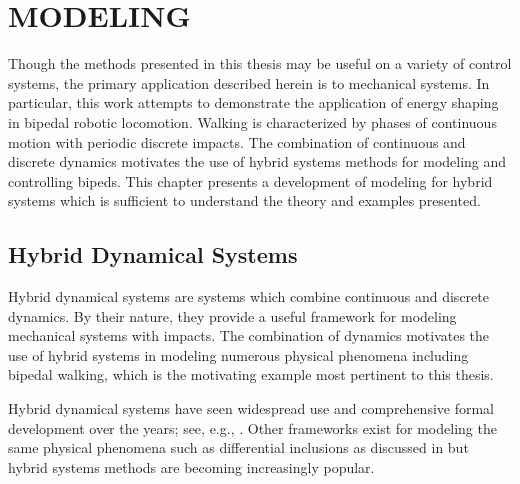 \chapter{\uppercase{Modeling}} \label{ch:modeling}

Though the methods presented in this thesis may be useful on a variety of
control systems, the primary application described herein is to mechanical
systems.
%
In particular, this work attempts to demonstrate the application of energy
shaping in bipedal robotic locomotion.
%
Walking is characterized by phases of continuous motion with periodic discrete
impacts.
%
The combination of continuous and discrete dynamics motivates the use of hybrid
systems methods for modeling and controlling bipeds.
%
This chapter presents a development of modeling for hybrid systems which is
sufficient to understand the theory and examples presented.


\section{Hybrid Dynamical Systems}

Hybrid dynamical systems are systems which combine continuous and discrete
dynamics.
%
By their nature, they provide a useful framework for modeling mechanical systems
with impacts.
%
The combination of dynamics motivates the use of hybrid systems in modeling
numerous physical phenomena including bipedal walking, which is the motivating
example most pertinent to this thesis.
%

Hybrid dynamical systems have seen widespread use and comprehensive formal
development over the years;
%
see, e.g., \cite{Branicky1998, Goebel2009, Grizzle2014, Schaft2000,
  Westervelt2007}.
%
Other frameworks exist for modeling the same physical phenomena such as
differential inclusions as discussed in \cite{Filippov1988} but hybrid systems
methods are becoming increasingly popular.

